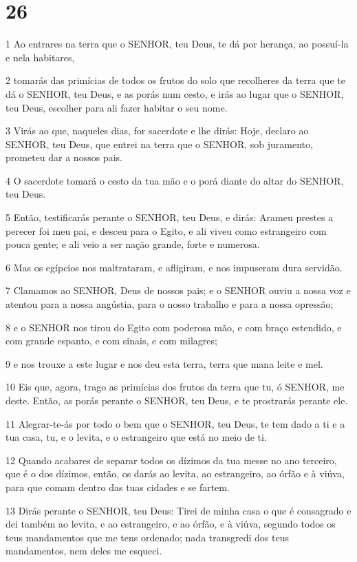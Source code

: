 \chapter{26}

\par 1 Ao entrares na terra que o SENHOR, teu Deus, te dá por herança, ao possuí-la e nela habitares,
\par 2 tomarás das primícias de todos os frutos do solo que recolheres da terra que te dá o SENHOR, teu Deus, e as porás num cesto, e irás ao lugar que o SENHOR, teu Deus, escolher para ali fazer habitar o seu nome.
\par 3 Virás ao que, naqueles dias, for sacerdote e lhe dirás: Hoje, declaro ao SENHOR, teu Deus, que entrei na terra que o SENHOR, sob juramento, prometeu dar a nossos pais.
\par 4 O sacerdote tomará o cesto da tua mão e o porá diante do altar do SENHOR, teu Deus.
\par 5 Então, testificarás perante o SENHOR, teu Deus, e dirás: Arameu prestes a perecer foi meu pai, e desceu para o Egito, e ali viveu como estrangeiro com pouca gente; e ali veio a ser nação grande, forte e numerosa.
\par 6 Mas os egípcios nos maltrataram, e afligiram, e nos impuseram dura servidão.
\par 7 Clamamos ao SENHOR, Deus de nossos pais; e o SENHOR ouviu a nossa voz e atentou para a nossa angústia, para o nosso trabalho e para a nossa opressão;
\par 8 e o SENHOR nos tirou do Egito com poderosa mão, e com braço estendido, e com grande espanto, e com sinais, e com milagres;
\par 9 e nos trouxe a este lugar e nos deu esta terra, terra que mana leite e mel.
\par 10 Eis que, agora, trago as primícias dos frutos da terra que tu, ó SENHOR, me deste. Então, as porás perante o SENHOR, teu Deus, e te prostrarás perante ele.
\par 11 Alegrar-te-ás por todo o bem que o SENHOR, teu Deus, te tem dado a ti e a tua casa, tu, e o levita, e o estrangeiro que está no meio de ti.
\par 12 Quando acabares de separar todos os dízimos da tua messe no ano terceiro, que é o dos dízimos, então, os darás ao levita, ao estrangeiro, ao órfão e à viúva, para que comam dentro das tuas cidades e se fartem.
\par 13 Dirás perante o SENHOR, teu Deus: Tirei de minha casa o que é consagrado e dei também ao levita, e ao estrangeiro, e ao órfão, e à viúva, segundo todos os teus mandamentos que me tens ordenado; nada transgredi dos teus mandamentos, nem deles me esqueci.
